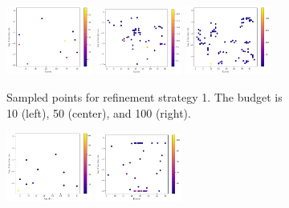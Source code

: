 \begin{figure}[H]
	\begin{subfigure}{\textwidth}
		\centering
		\includegraphics[width=0.31\textwidth]{figures/Adaptive_random/Machine_learning_first/Alternative_0_budget_10}
		\includegraphics[width=0.31\textwidth]{figures/Adaptive_random/Machine_learning_first/Alternative_0_budget_50}
		\includegraphics[width=0.31\textwidth]{figures/Adaptive_random/Machine_learning_first/Alternative_0_budget_100}
		\caption{ Sampled points for refinement strategy 1. The budget is 10 (left), 50 (center), and 100 (right). }
		\label{fig:alt0_ml}
	\end{subfigure}
	\begin{subfigure}{\textwidth}
		\centering
		\includegraphics[width=0.31\textwidth]{figures/Adaptive_random/Machine_learning_first/Alternative_1_budget_10}
		\includegraphics[width=0.31\textwidth]{figures/Adaptive_random/Machine_learning_first/Alternative_1_budget_50}

\end{subfigure}
\end{figure}
